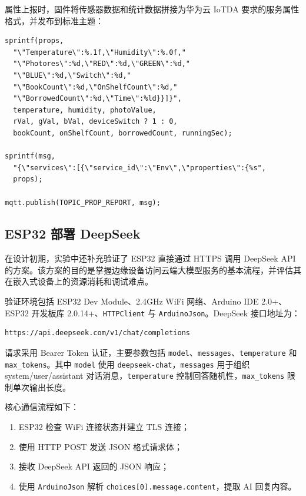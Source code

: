 \documentclass[12pt,hyperref,a4paper,UTF8]{ctexart}
\begin{document}
属性上报时，固件将传感器数据和统计数据拼接为华为云 IoTDA 要求的服务属性格式，并发布到标准主题：

\begin{lstlisting}
sprintf(props,
  "\"Temperature\":%.1f,\"Humidity\":%.0f,"
  "\"Photores\":%d,\"RED\":%d,\"GREEN\":%d,"
  "\"BLUE\":%d,\"Switch\":%d,"
  "\"BookCount\":%d,\"OnShelfCount\":%d,"
  "\"BorrowedCount\":%d,\"Time\":%ld}}]}",
  temperature, humidity, photoValue,
  rVal, gVal, bVal, deviceSwitch ? 1 : 0,
  bookCount, onShelfCount, borrowedCount, runningSec);

sprintf(msg,
  "{\"services\":[{\"service_id\":\"Env\",\"properties\":{%s",
  props);

mqtt.publish(TOPIC_PROP_REPORT, msg);
\end{lstlisting}

\subsection{ESP32 部署 DeepSeek}

在设计初期，实验中还补充验证了 ESP32 直接通过 HTTPS 调用 DeepSeek API 的方案。该方案的目的是掌握边缘设备访问云端大模型服务的基本流程，并评估其在嵌入式设备上的资源消耗和调试难点。

验证环境包括 ESP32 Dev Module、2.4GHz WiFi 网络、Arduino IDE 2.0+、ESP32 开发板库 2.0.14+、\texttt{HTTPClient} 与 \texttt{ArduinoJson}。DeepSeek 接口地址为：

\begin{lstlisting}
https://api.deepseek.com/v1/chat/completions
\end{lstlisting}

请求采用 Bearer Token 认证，主要参数包括 \texttt{model}、\texttt{messages}、\texttt{temperature} 和 \texttt{max\_tokens}。其中 \texttt{model} 使用 \texttt{deepseek-chat}，\texttt{messages} 用于组织 system/user/assistant 对话消息，\texttt{temperature} 控制回答随机性，\texttt{max\_tokens} 限制单次输出长度。

核心通信流程如下：

\begin{enumerate}
    \item ESP32 检查 WiFi 连接状态并建立 TLS 连接；
    \item 使用 HTTP POST 发送 JSON 格式请求体；
    \item 接收 DeepSeek API 返回的 JSON 响应；
    \item 使用 \texttt{ArduinoJson} 解析 \texttt{choices[0].message.content}，提取 AI 回复内容。
\end{enumerate}
\end{document}
